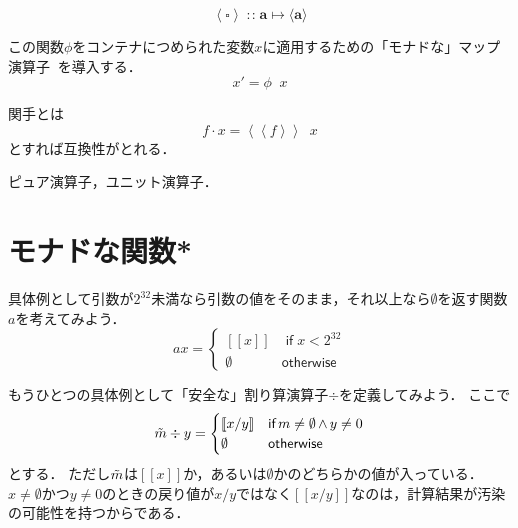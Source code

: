 \documentclass[a5paper,draft]{jsbook}
\def\[{\left[\!\left[}
\def\]{\right]\!\right]}
\newcommand{\mathTypeParameter}[1]{\mathbf{#1}}
\newcommand{\mathMaybeWith}[1]{\[#1\]}
\newcommand{\mathPureWith}[1]{\left\langle#1\right\rangle}
\newcommand{\mathUnitWith}[1]{\left\langle\!\left\langle#1\right\rangle\!\right\rangle}
\newcommand{\mathMaybeVar}[1]{\Tilde{#1}}
\newcommand{\mathNothing}{\emptyset}%
\newcommand{\mathSomething}{\square}
\newcommand{\mathBinaryOperator}[1]{\operatorname{#1}}
\newcommand{\mathAnd}{\mathBinaryOperator{\wedge}}
\newcommand{\mathGeneralMap}{\mathBinaryOperator{\cdot}}
\newcommand{\mathIn}{\mathBinaryOperator{:\!:}}
\newcommand{\mathMapsTo}{\mapsto}
\newcommand{\mathKeyword}[1]{\operatorname{\textsf{#1}}}
\newcommand{\mathIf}{\mathKeyword{if}}
\newcommand{\mathOtherwise}{\mathKeyword{otherwise}}
\newcommand{\mathMorph}[2]{#1\mathMapsTo#2}
\DeclareMathOperator{\hsklMonadMap}{{DO NOT USE}--\heartsuit}
\begin{document}
$$\mathPureWith{\mathSomething}\mathIn\mathMorph{\mathTypeParameter{a}}{\langle\mathTypeParameter{a}\rangle}$$

この関数$\phi$をコンテナにつめられた変数$x$に適用するための「モナドな」マップ演算子$\hsklMonadMap$を導入する．
$$x'=\phi\hsklMonadMap x$$

関手とは
$$f\mathGeneralMap x=\mathUnitWith{f}\hsklMonadMap x$$
とすれば互換性がとれる．


ピュア演算子，ユニット演算子．


\section{モナドな関数*}


具体例として引数が$2^{32}$未満なら引数の値をそのまま，それ以上なら$\mathNothing$を返す関数$a$を考えてみよう．
\begin{equation}
ax=\begin{cases}
\mathMaybeWith{x}&\mathIf x<2^{32}\\
\mathNothing&\mathOtherwise
\end{cases}
\end{equation}


もうひとつの具体例として「安全な」割り算演算子$\div$を定義してみよう．
ここで
\begin{equation}
\mathMaybeVar{m}\div y=\begin{cases}\mathMaybeWith{x/y}&\mathIf m\neq\mathNothing\mathAnd y\neq0\\
\mathNothing&\mathOtherwise\end{cases}
\end{equation}
とする．
ただし$\mathMaybeVar{m}$は$\mathMaybeWith{x}$か，あるいは$\mathNothing$かのどちらかの値が入っている．
$x\neq\mathNothing$かつ$y\neq0$のときの戻り値が$x/y$ではなく$\mathMaybeWith{x/y}$なのは，計算結果が汚染の可能性を持つからである．
\end{document}
